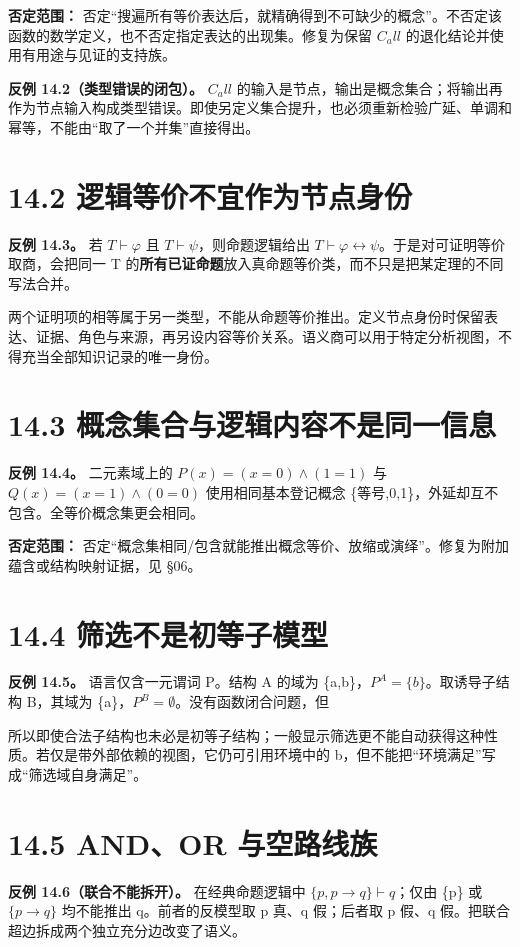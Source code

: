 \documentclass[UTF8,a4paper,zihao=-4,fontset=windows,openany]{ctexbook}
\newcommand{\mcsdisplay}[1]{%
  \par\addvspace{0.7em}%
  \sbox{\mcsmathbox}{\ensuremath{\displaystyle #1}}%
  \ifdim\wd\mcsmathbox>\linewidth
    \noindent\resizebox{\linewidth}{!}{\usebox{\mcsmathbox}}%
  \else
    \noindent\hspace*{\fill}\usebox{\mcsmathbox}\hspace*{\fill}%
  \fi
  \par\addvspace{0.7em}%
}
\def\ensuremath#1{#1}%
\def\mathrm#1{#1}%
\begin{document}
\textbf{否定范围：} 否定“搜遍所有等价表达后，就精确得到不可缺少的概念”。不否定该函数的数学定义，也不否定指定表达的出现集。修复为保留 \(C_\mathrm{all}\) 的退化结论并使用有用途与见证的支持族。

\textbf{反例 14.2（类型错误的闭包）。} \(C_\mathrm{all}\) 的输入是节点，输出是概念集合；将输出再作为节点输入构成类型错误。即使另定义集合提升，也必须重新检验广延、单调和幂等，不能由“取了一个并集”直接得出。

\section{14.2 逻辑等价不宜作为节点身份}
\textbf{反例 14.3。} 若 \(T\vdash\varphi\) 且 \(T\vdash\psi\)，则命题逻辑给出 \(T\vdash\varphi\leftrightarrow\psi\)。于是对可证明等价取商，会把同一 T 的\textbf{所有已证命题}放入真命题等价类，而不只是把某定理的不同写法合并。

两个证明项的相等属于另一类型，不能从命题等价推出。定义节点身份时保留表达、证据、角色与来源，再另设内容等价关系。语义商可以用于特定分析视图，不得充当全部知识记录的唯一身份。

\section{14.3 概念集合与逻辑内容不是同一信息}
\textbf{反例 14.4。} 二元素域上的 \(P(x)=(x=0)\land(1=1)\) 与 \(Q(x)=(x=1)\land(0=0)\) 使用相同基本登记概念 \{等号,0,1\}，外延却互不包含。全等价概念集更会相同。

\textbf{否定范围：} 否定“概念集相同/包含就能推出概念等价、放缩或演绎”。修复为附加蕴含或结构映射证据，见 §06。

\section{14.4 筛选不是初等子模型}
\textbf{反例 14.5。} 语言仅含一元谓词 P。结构 A 的域为 \{a,b\}，\(P^A=\{b\}\)。取诱导子结构 B，其域为 \{a\}，\(P^B=\emptyset\)。没有函数闭合问题，但


\mcsdisplay{A\models\exists x\,P(x),\qquad B\not\models\exists x\,P(x).}
\noindent 所以即使合法子结构也未必是初等子结构；一般显示筛选更不能自动获得这种性质。若仅是带外部依赖的视图，它仍可引用环境中的 b，但不能把“环境满足”写成“筛选域自身满足”。

\section{14.5 AND、OR 与空路线族}
\textbf{反例 14.6（联合不能拆开）。} 在经典命题逻辑中 \(\{p,p\to q\}\vdash q\)；仅由 \{p\} 或 \(\{p\to q\}\) 均不能推出 q。前者的反模型取 p 真、q 假；后者取 p 假、q 假。把联合超边拆成两个独立充分边改变了语义。
\end{document}
